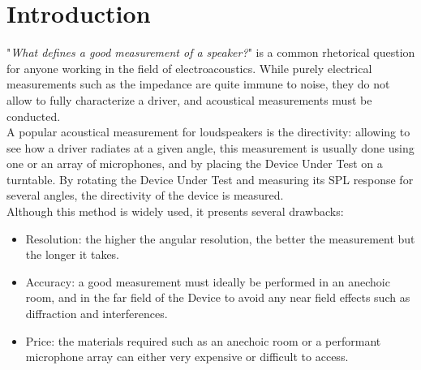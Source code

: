 \documentclass{report}
\begin{document}

    



\chapter*{Introduction}


"\textit{What defines a good measurement of a speaker?}" is a common rhetorical question for anyone working in the field of electroacoustics. While purely electrical measurements such as the impedance are quite immune to noise, they do not allow to fully characterize a driver, and acoustical measurements must be conducted. \\
A popular acoustical measurement for loudspeakers is the directivity: allowing to see how a driver radiates at a given angle, this measurement is usually done using one or an array of microphones, and by placing the Device Under Test on a turntable. By rotating the Device Under Test and measuring its SPL response for several angles, the directivity of the device is measured. \\

Although this method is widely used, it presents several drawbacks:
\begin{itemize}
\item Resolution: the higher the angular resolution, the better the measurement but the longer it takes. 
\item Accuracy: a good measurement must ideally be performed in an anechoic room, and in the far field of the Device to avoid any near field effects such as diffraction and interferences.
\item Price: the materials required such as an anechoic room or a performant microphone array can either very expensive or difficult to access. 
\end{itemize}
\end{document}
